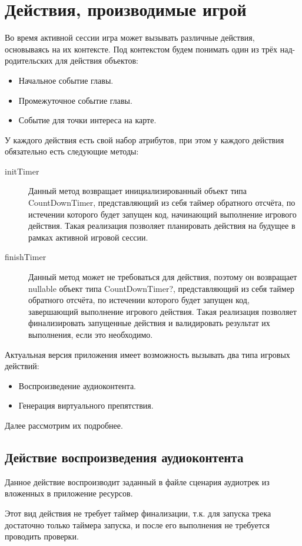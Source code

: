 \section{Действия, производимые игрой}
\label{sec:actions}
Во время активной сессии игра может вызывать различные действия, основываясь на их контексте. Под контекстом будем понимать один из трёх над-родительских для действия объектов:
\begin{itemize}
	\item Начальное событие главы.
	\item Промежуточное событие главы.
	\item Событие для точки интереса на карте.
\end{itemize}
У каждого действия есть свой набор атрибутов, при этом у каждого действия обязательно есть следующие методы:
\begin{description}
	\item[initTimer] Данный метод возвращает инициализированный объект типа CountDownTimer, представляющий из себя таймер обратного отсчёта, по истечении которого будет запущен код, начинающий выполнение игрового действия. Такая реализация позволяет планировать действия на будущее в рамках активной игровой сессии.
	\item[finishTimer] Данный метод может не требоваться для действия, поэтому он возвращает  nullable объект типа CountDownTimer?, представляющий из себя таймер обратного отсчёта, по истечении которого будет запущен код, завершающий выполнение игрового действия. Такая реализация позволяет финализировать запущенные действия и валидировать результат их выполнения, если это необходимо.
\end{description}
\smallskip
Актуальная версия приложения имеет возможность вызывать два типа игровых действий:
\begin{itemize}
	\item Воспроизведение аудиоконтента.
	\item Генерация виртуального препятствия.
\end{itemize}
\smallskip
Далее рассмотрим их подробнее.

\subsection*{Действие воспроизведения аудиоконтента}
Данное действие воспроизводит заданный в файле сценария аудиотрек из вложенных в приложение ресурсов.

Этот вид действия не требует таймер финализации, т.к. для запуска трека достаточно только таймера запуска, и после его выполнения не требуется проводить проверки.

